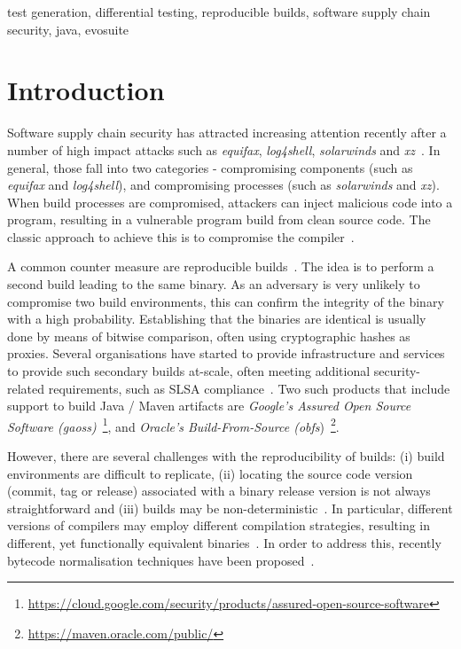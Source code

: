 \documentclass[conference]{IEEEtran}
\begin{document}
\begin{IEEEkeywords}
test generation, differential testing, reproducible builds, software supply chain security, java, evosuite
\end{IEEEkeywords}

\section{Introduction}

Software supply chain security has attracted increasing attention recently after a number of high impact attacks such as \textit{equifax}, \textit{log4shell}, \textit{solarwinds} and \textit{xz}~\cite{ellison2010evaluating,martinez2021software,enck2022top,EO14028}. In general, those fall into two categories - compromising components (such as \textit{equifax} and \textit{log4shell}), and compromising processes (such as \textit{solarwinds} and \textit{xz}). When build processes are compromised, attackers can inject malicious code into a program, resulting in a vulnerable program build from clean source code. The classic approach to achieve this is to compromise the compiler~\cite{thompson1984reflections}. 

A common counter measure are reproducible builds~\cite{reproduciblebuild, lamb2021reproducible}. The idea is to perform a second build leading to the same binary. As an adversary is very unlikely to compromise two build environments, this can confirm the integrity of the binary with a high probability. Establishing that the binaries are identical is usually done by means of bitwise comparison, often using cryptographic hashes as proxies.
Several organisations have started to provide infrastructure and services to provide such secondary builds at-scale, often meeting additional security-related requirements, such as SLSA compliance~\cite{slsa}. Two such products that include support to build Java / Maven artifacts are \textit{Google's Assured Open Source Software (gaoss)}~\footnote{\url{https://cloud.google.com/security/products/assured-open-source-software}}, and \textit{Oracle's Build-From-Source (obfs})~\footnote{\url{https://maven.oracle.com/public/}}.

However, there are several challenges with the reproducibility of builds: (i) build environments are difficult to replicate, (ii) locating the source code version (commit, tag or release) associated with a binary release version is not always straightforward and (iii) builds may be non-deterministic~\cite{xiong2022towards,hassanshahi2023macaron,bineqdataset,keshani2024aroma}. In particular, different versions of compilers may employ different compilation strategies, resulting in different, yet functionally equivalent binaries~\cite{xiong2022towards,bineqdataset,schott2024JNorm}.  
In order to address this, recently bytecode normalisation techniques have been proposed~\cite{xiong2022towards,dietrich2024levelsbinaryequivalencecomparison,schott2024JNorm}. 
\end{document}
